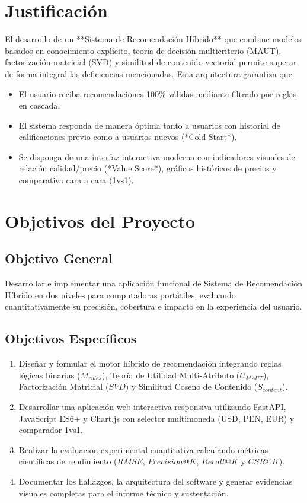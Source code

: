 \section{Justificación}
El desarrollo de un **Sistema de Recomendación Híbrido** que combine modelos basados en conocimiento explícito, teoría de decisión multicriterio (MAUT), factorización matricial (SVD) y similitud de contenido vectorial permite superar de forma integral las deficiencias mencionadas. Esta arquitectura garantiza que:
\begin{itemize}
    \item El usuario reciba recomendaciones 100\% válidas mediante filtrado por reglas en cascada.
    \item El sistema responda de manera óptima tanto a usuarios con historial de calificaciones previo como a usuarios nuevos (*Cold Start*).
    \item Se disponga de una interfaz interactiva moderna con indicadores visuales de relación calidad/precio (*Value Score*), gráficos históricos de precios y comparativa cara a cara (1vs1).
\end{itemize}

\section{Objetivos del Proyecto}

\subsection{Objetivo General}
Desarrollar e implementar una aplicación funcional de Sistema de Recomendación Híbrido en dos niveles para computadoras portátiles, evaluando cuantitativamente su precisión, cobertura e impacto en la experiencia del usuario.

\subsection{Objetivos Específicos}
\begin{enumerate}
    \item Diseñar y formular el motor híbrido de recomendación integrando reglas lógicas binarias ($M_{rules}$), Teoría de Utilidad Multi-Atributo ($U_{MAUT}$), Factorización Matricial ($SVD$) y Similitud Coseno de Contenido ($S_{content}$).
    \item Desarrollar una aplicación web interactiva responsiva utilizando FastAPI, JavaScript ES6+ y Chart.js con selector multimoneda (USD, PEN, EUR) y comparador 1vs1.
    \item Realizar la evaluación experimental cuantitativa calculando métricas científicas de rendimiento ($RMSE$, $Precision@K$, $Recall@K$ y $CSR@K$).
    \item Documentar los hallazgos, la arquitectura del software y generar evidencias visuales completas para el informe técnico y sustentación.
\end{enumerate}